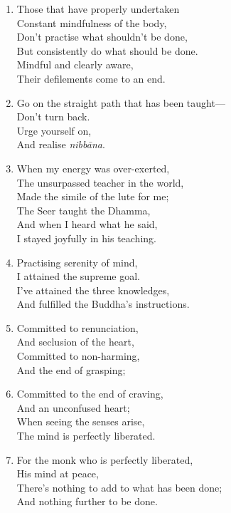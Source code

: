 \documentclass[10pt, openany]{book}
\begin{document}
\begin{enumerate}
\item Those that have properly undertaken\\
Constant mindfulness of the body,\\
Don’t practise what shouldn’t be done,\\
But consistently do what should be done.\\
Mindful and clearly aware,\\
Their defilements come to an end.

\item Go on the straight path that has been taught—\\
Don’t turn back.\\
Urge yourself on,\\
And realise \emph{nibbāna}.

\item When my energy was over-exerted,\\
The unsurpassed teacher in the world,\\
Made the simile of the lute for me;\\
The Seer taught the Dhamma,\\
And when I heard what he said,\\
I stayed joyfully in his teaching.

\item Practising serenity of mind,\\
I attained the supreme goal.\\
I’ve attained the three knowledges,\\
And fulfilled the Buddha’s instructions.

\item Committed to renunciation,\\
And seclusion of the heart,\\
Committed to non-harming,\\
And the end of grasping;

\item Committed to the end of craving,\\
And an unconfused heart;\\
When seeing the senses arise,\\
The mind is perfectly liberated.

\item For the monk who is perfectly liberated,\\
His mind at peace,\\
There’s nothing to add to what has been done;\\
And nothing further to be done.


\end{enumerate}
\end{document}
